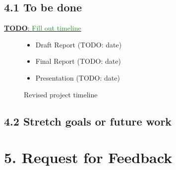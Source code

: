 \documentclass[11pt, a4paper, twoside, openright]{report}
\newcommand{\todo}[1]{\huge{\underline{\textbf{\textcolor{RubineRed}{TODO}}: \textcolor{ForestGreen}{#1}}}\normalsize }
\begin{document}
\subsection*{4.1 To be done}



\todo{Fill out timeline}
\begin{figure}
    \begin{itemize}
        \item Draft Report (TODO: date)
        \item Final Report (TODO: date)
        \item Presentation (TODO: date)
    \end{itemize}
    \caption{Revised project timeline}\label{list:timeline}
\end{figure}

\subsection*{4.2 Stretch goals or future work}




\section*{5. Request for Feedback}



\backmatter{}

%



\appendix
% 
\end{document}

